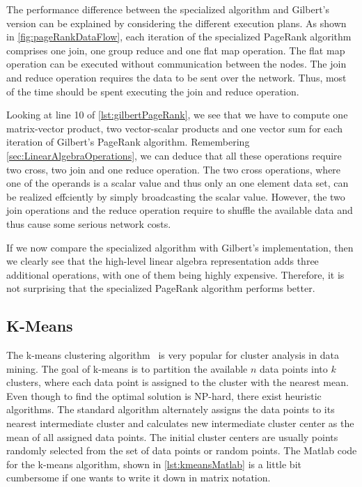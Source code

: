 The performance difference between the specialized algorithm and Gilbert's version can be explained by considering the different execution plans.
As shown in \cref{fig:pageRankDataFlow}, each iteration of the specialized PageRank algorithm comprises one join, one group reduce and one flat map operation.
The flat map operation can be executed without communication between the nodes.
The join and reduce operation requires the data to be sent over the network.
Thus, most of the time should be spent executing the join and reduce operation.

Looking at line 10 of \cref{lst:gilbertPageRank}, we see that we have to compute one matrix-vector product, two vector-scalar products and one vector sum for each iteration of Gilbert's PageRank algorithm.
Remembering \cref{sec:LinearAlgebraOperations}, we can deduce that all these operations require two cross, two join and one reduce operation.
The two cross operations, where one of the operands is a scalar value and thus only an one element data set, can be realized effciently by simply broadcasting the scalar value.
However, the two join operations and the reduce operation require to shuffle the available data and thus cause some serious network costs.

If we now compare the specialized algorithm with Gilbert's implementation, then we clearly see that the high-level linear algebra representation adds three additional operations, with one of them being highly expensive.
Therefore, it is not surprising that the specialized PageRank algorithm performs better.

\subsection{K-Means}

The k-means clustering algorithm~\cite{macqueen:1967a} is very popular for cluster analysis in data mining.
The goal of k-means is to partition the available $n$ data points into $k$ clusters, where each data point is assigned to the cluster with the nearest mean.
Even though to find the optimal solution is NP-hard, there exist heuristic algorithms.
The standard algorithm alternately assigns the data points to its nearest intermediate cluster and calculates new intermediate cluster center as the mean of all assigned data points.
The initial cluster centers are usually points randomly selected from the set of data points or random points.
The Matlab code for the k-means algorithm, shown in \cref{lst:kmeansMatlab} is a little bit cumbersome if one wants to write it down in matrix notation.

